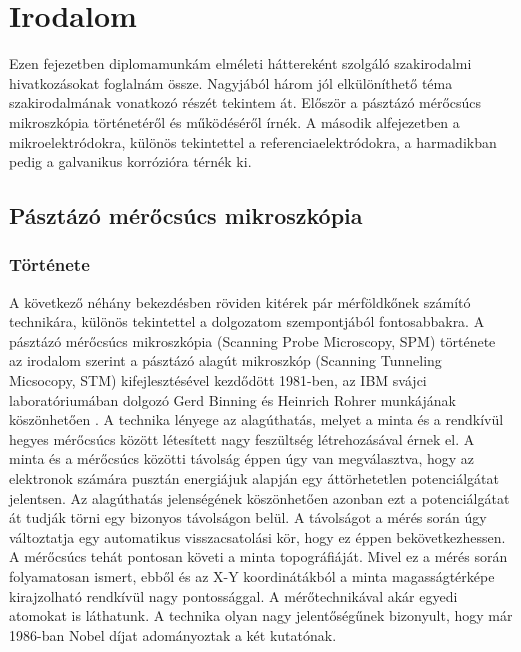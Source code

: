 \chapter{Irodalom}
\pagestyle{headings}

Ezen fejezetben diplomamunkám elméleti háttereként szolgáló szakirodalmi hivatkozásokat foglalnám össze. Nagyjából három jól elkülöníthető téma szakirodalmának vonatkozó részét tekintem át. Először a pásztázó mérőcsúcs mikroszkópia történetéről és működéséről írnék. A második alfejezetben a mikroelektródokra, különös tekintettel a referenciaelektródokra, a harmadikban pedig a galvanikus korrózióra térnék ki.

\section{Pásztázó mérőcsúcs mikroszkópia}

\subsection{Története}




A következő néhány bekezdésben röviden kitérek pár mérföldkőnek számító technikára, különös tekintettel a dolgozatom szempontjából fontosabbakra. A pásztázó mérőcsúcs mikroszkópia (Scanning Probe Microscopy, SPM) története az irodalom szerint a pásztázó alagút mikroszkóp (Scanning Tunneling Micsocopy, STM) kifejlesztésével kezdődött 1981-ben, az IBM svájci laboratóriumában dolgozó Gerd Binning és Heinrich Rohrer munkájának köszönhetően \cite{binnig1982tunneling}. A technika lényege az alagúthatás, melyet a minta és a rendkívül hegyes mérőcsúcs között létesített nagy feszültség létrehozásával érnek el. A minta és a mérőcsúcs közötti távolság éppen úgy van megválasztva, hogy az elektronok számára pusztán energiájuk alapján egy áttörhetetlen potenciálgátat jelentsen. Az alagúthatás jelenségének köszönhetően azonban ezt a potenciálgátat át tudják törni egy bizonyos távolságon belül. A távolságot a mérés során úgy változtatja egy automatikus visszacsatolási kör, hogy ez éppen bekövetkezhessen. A mérőcsúcs tehát pontosan követi a minta topográfiáját. Mivel ez a mérés során folyamatosan ismert, ebből és az X-Y koordinátákból a minta magasságtérképe kirajzolható rendkívül nagy pontossággal. A mérőtechnikával akár egyedi atomokat is láthatunk. A technika olyan nagy jelentőségűnek bizonyult, hogy már 1986-ban Nobel díjat adományoztak a két kutatónak.


